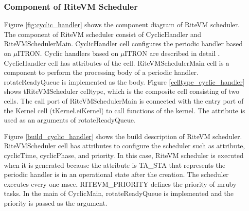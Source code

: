 \documentclass{sig-alternate-05-2015}
\begin{document}
\subsubsection{Component of RiteVM Scheduler}
Figure \ref{fig:cyclic_handler} shows the component diagram of RiteVM scheduler.
The component of RiteVM scheduler consist of CyclicHandler and RiteVMSchedulerMain.
CyclicHandler {\myit cell} configures the periodic handler based on $\mu$ITRON.
Cyclic handlers based on $\mu$ITRON are described in detail \cite{par:microITRON}.
CyclicHandler {\myit cell} has attributes of the {\myit cell}.
RiteVMSchedulerMain {\myit cell} is a component to perform the processing body of a periodic handler.
{\myit rotateReadyQueue} is implemented as the body.
Figure \ref{celltype_cyclic_handler} shows tRiteVMScheduler {\myit celltype}, which is the {\myit composite cell} consisting of two {\myit cell}s.
The {\myit call} port of RiteVMSchedulerMain is connected with the {\myit entry} port of the Kernel {\myit cell} ({\myit tKernel.eiKernel}) to call functions of the kernel. 
The attribute is used as an arguments of {\myit rotateReadyQueue}.

Figure \ref{build_cyclic_handler} shows the build description of RiteVM scheduler.
RiteVMScheduler {\myit cell} has attributes to configure the scheduler such as attribute, cyclicTime, cyclicPhase, and priority.
In this case, RiteVM scheduler is executed when it is generated because the attribute is {\myit TA\_STA} that represents the periodic handler is in an operational state after the creation.
The scheduler executes every one msec.
RITEVM\_PRIORITY defines the priority of mruby tasks.
In the main of CyclicMain, {\myit rotateReadyQueue} is implemented and the priority is passed as the argument.
\end{document}
